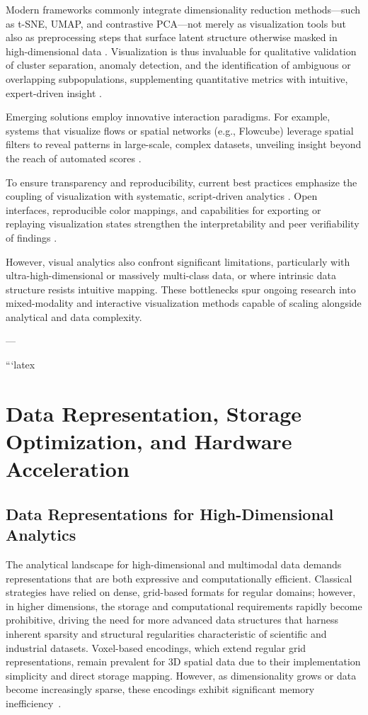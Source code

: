 \documentclass[11pt]{article}
\begin{document}
Modern frameworks commonly integrate dimensionality reduction methods—such as t-SNE, UMAP, and contrastive PCA—not merely as visualization tools but also as preprocessing steps that surface latent structure otherwise masked in high-dimensional data \cite{ref91,ref92,ref95}. Visualization is thus invaluable for qualitative validation of cluster separation, anomaly detection, and the identification of ambiguous or overlapping subpopulations, supplementing quantitative metrics with intuitive, expert-driven insight \cite{ref58,ref92,ref94,ref95}.

Emerging solutions employ innovative interaction paradigms. For example, systems that visualize flows or spatial networks (e.g., Flowcube) leverage spatial filters to reveal patterns in large-scale, complex datasets, unveiling insight beyond the reach of automated scores \cite{ref53}.

To ensure transparency and reproducibility, current best practices emphasize the coupling of visualization with systematic, script-driven analytics \cite{ref94,ref99,ref115}. Open interfaces, reproducible color mappings, and capabilities for exporting or replaying visualization states strengthen the interpretability and peer verifiability of findings \cite{ref86,ref115}.

However, visual analytics also confront significant limitations, particularly with ultra-high-dimensional or massively multi-class data, or where intrinsic data structure resists intuitive mapping. These bottlenecks spur ongoing research into mixed-modality and interactive visualization methods capable of scaling alongside analytical and data complexity.

---

```latex
\section{Data Representation, Storage Optimization, and Hardware Acceleration}
\label{sec:data-representation-optimization}

\subsection{Data Representations for High-Dimensional Analytics}

The analytical landscape for high-dimensional and multimodal data demands representations that are both expressive and computationally efficient. Classical strategies have relied on dense, grid-based formats for regular domains; however, in higher dimensions, the storage and computational requirements rapidly become prohibitive, driving the need for more advanced data structures that harness inherent sparsity and structural regularities characteristic of scientific and industrial datasets. Voxel-based encodings, which extend regular grid representations, remain prevalent for 3D spatial data due to their implementation simplicity and direct storage mapping. However, as dimensionality grows or data become increasingly sparse, these encodings exhibit significant memory inefficiency~\cite{ref86}.
\end{document}
